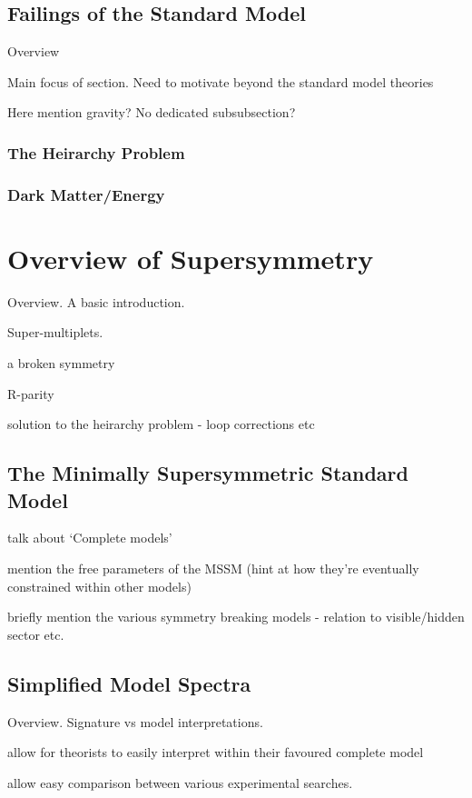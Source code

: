 \subsection{Failings of the Standard Model}
Overview

Main focus of section. Need to motivate beyond the standard model theories

Here mention gravity? No dedicated subsubsection?

\subsubsection{The Heirarchy Problem}
\subsubsection{Dark Matter/Energy}


\section{Overview of Supersymmetry}  %
\label{sec:theory_overview}
Overview. A basic introduction.

Super-multiplets.

a broken symmetry

R-parity

solution to the heirarchy problem - loop corrections etc

\subsection{The Minimally Supersymmetric Standard Model}
talk about `Complete models'

mention the free parameters of the MSSM (hint at how they're eventually 
constrained within other models)

briefly mention the various symmetry breaking models - relation to visible/hidden sector 
etc.


\subsection{Simplified Model Spectra}
Overview. Signature vs model interpretations.

allow for theorists to easily interpret within their favoured complete model

allow easy comparison between various experimental searches.

